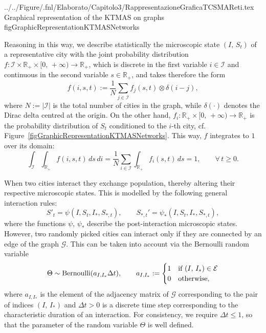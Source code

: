\documentclass[a4paper]{article}
\newcommand{\R}{\mathbb{R}}
\begin{document}
  {../../Figure/.fnl/Elaborato/Capitolo3/RappresentazioneGraficaTCSMAReti.tex}
  {Graphical representation of the KTMAS on graphs}
  {\linewidth}{figGraphicRepresentationKTMASNetworks}

Reasoning in this way, we describe statistically the microscopic state $(I,\,S_t)$ of a representative city with the joint probability distribution $f:\mathcal I\times\R_+\times [0,\,+\infty)\to\R_+$, which is discrete in the first variable $i\in\mathcal I$ and continuous in the second variable $s\in\R_+$, and takes therefore the form
\begin{equation}
    f(i,s,t):=\frac{1}{N}\sum_{j\in\mathcal I}f_j(s,t)\otimes\delta(i-j),
    \label{eqUrbanJointDensity}
\end{equation}
where $N:=\vert\mathcal I\vert$ is the total number of cities in the graph, while $\delta(\cdot)$ denotes the Dirac delta centred at the origin. On the other hand, $f_i:\R_+\times [0,\,+\infty)\to\R_+$ is the probability distribution of $S_t$ conditioned to the $i$-th city, cf. Figure~\ref{figGraphicRepresentationKTMASNetworks}. This way, $f$ integrates to $1$ over its domain:
$$ \int_{\mathcal I}\int_{\R_+}f(i,s,t)\,ds\,di=\frac{1}{N}\sum_{i\in\mathcal I}\int_{\R_+}f_i(s,t)\,ds=1, \qquad \forall\,t\geq 0. $$
            
When two cities interact they exchange population, thereby altering their respective microscopic states. This is modelled by the following general interaction rules:
\begin{equation}
    S'_t=\psi(I,S_t,I_\ast,S_{\ast,t}), \qquad S_{\ast,t}'=\psi_\ast(I,S_t,I_\ast,S_{\ast,t}),
    \label{eqUrbanInteractionRules}
\end{equation}
where the functions $\psi,\,\psi_\ast$ describe the post-interaction microscopic states. However, two randomly picked cities can interact only if they are connected by an edge of the graph $\mathcal G$. This can be taken into account via the Bernoulli random variable
\begin{equation}
    \Theta\sim\Bernoulli(a_{I,I_\ast}\Delta t), \qquad
        a_{I,I_\ast}:=
        \begin{cases}
            1 & \text{if } (I,\,I_\ast)\in\mathcal E \\
            0 & \text{otherwise},
        \end{cases}
    \label{eqUrbanInteractionBernoulli}
\end{equation}
where $a_{I,I_\ast}$ is the element of the adjacency matrix of $\mathcal G$ corresponding to the pair of indices $(I,\,I_\ast)$ and $\Delta{t}>0$ is a discrete time step corresponding to the characteristic duration of an interaction. For consistency, we require $\Delta{t}\leq 1$, so that the parameter of the random variable $\Theta$ is well defined.
\end{document}
